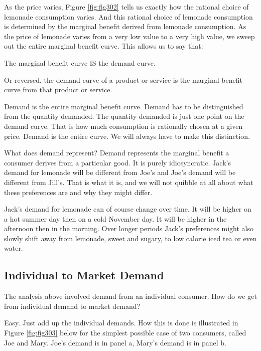 \documentclass[
]{book}
\begin{document}
As the price varies, Figure \ref{fig:fig302} tells us exactly how the rational choice of lemonade consumption varies. And this rational choice of lemonade consumption is determined by the marginal benefit derived from lemonade consumption. As the price of lemonade varies from a very low value to a very high value, we sweep out the entire marginal benefit curve. This allows us to say that:

The marginal benefit curve IS the demand curve.

Or reversed, the demand curve of a product or service is the marginal benefit curve from that product or service.

Demand is the entire marginal benefit curve. Demand has to be distinguished from the quantity demanded. The quantity demanded is just one point on the demand curve. That is how much consumption is rationally chosen at a given price. Demand is the entire curve. We will always have to make this distinction.

What does demand represent? Demand represents the marginal benefit a consumer derives from a particular good. It is purely idiosyncratic. Jack's demand for lemonade will be different from Joe's and Joe's demand will be different from Jill's. That is what it is, and we will not quibble at all about what these preferences are and why they might differ.

Jack's demand for lemonade can of course change over time. It will be higher on a hot summer day then on a cold November day. It will be higher in the afternoon then in the morning. Over longer periods Jack's preferences might also slowly shift away from lemonade, sweet and sugary, to low calorie iced tea or even water.

\hypertarget{individual-to-market-demand}{%
\subsection{Individual to Market Demand}\label{individual-to-market-demand}}

The analysis above involved demand from an individual consumer. How do we get from individual demand to market demand?

Easy. Just add up the individual demands. How this is done is illustrated in Figure \ref{fig:fig303} below for the simplest possible case of two consumers, called Joe and Mary. Joe's demand is in panel a, Mary's demand is in panel b.
\end{document}
